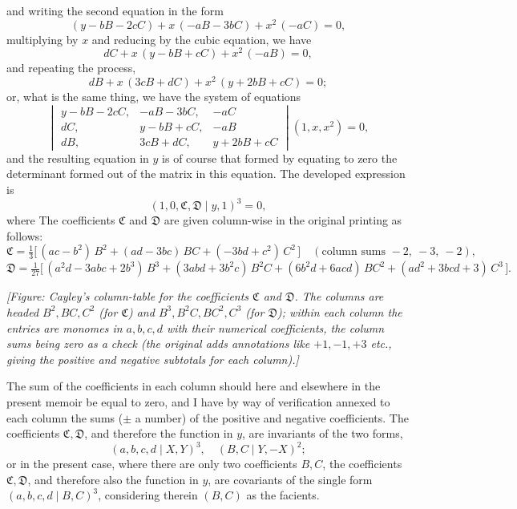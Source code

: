 \documentclass[11pt]{article}
\newcommand{\Cdel}{\mid}
\begin{document}
\noindent and writing the second equation in the form
\[
(y - b B - 2 c C) + x\,(-a B - 3 b C) + x^2\,(-a C) = 0,
\]
multiplying by $x$ and reducing by the cubic equation, we have
\[
dC + x\,(y - b B + c C) + x^2\,(-a B) = 0,
\]
and repeating the process,
\[
dB + x\,(3 c B + d C) + x^2\,(y + 2 b B + c C) = 0;
\]
or, what is the same thing, we have the system of equations
\[
\begin{vmatrix}
y - b B - 2 c C, & -a B - 3 b C, & -a C \\
d C, & y - b B + c C, & -a B \\
d B, & 3 c B + d C, & y + 2 b B + c C
\end{vmatrix}\!(1, x, x^2) = 0,
\]
and the resulting equation in $y$ is of course that formed by equating to zero the determinant formed out of the matrix in this equation. The developed expression is
\[
(1, 0, \mathfrak{C}, \mathfrak{D} \Cdel y, 1)^3 = 0,
\]
where
The coefficients $\mathfrak{C}$ and $\mathfrak{D}$ are given column-wise in the original printing as follows:
\[
\mathfrak{C} = \tfrac{1}{3}\big[\, (ac - b^2)\, B^2 + (ad - 3 bc)\, BC + (-3 bd + c^2)\, C^2\,\big] \quad (\text{column sums } -2,\ -3,\ -2),
\]
\[
\mathfrak{D} = \tfrac{1}{27}\big[\, (a^2 d - 3 abc + 2 b^3)\, B^3 + (3 abd + 3 b^2 c)\, B^2 C + (6 b^2 d + 6 acd)\, B C^2 + (a d^2 + 3 bcd + 3)\, C^3\,\big].
\]

\medskip

\textit{[Figure: Cayley's column-table for the coefficients $\mathfrak{C}$ and $\mathfrak{D}$. The columns are headed $B^2, BC, C^2$ (for $\mathfrak{C}$) and $B^3, B^2 C, B C^2, C^3$ (for $\mathfrak{D}$); within each column the entries are monomes in $a, b, c, d$ with their numerical coefficients, the column sums being zero as a check (the original adds annotations like $+1, -1, +3$ etc., giving the positive and negative subtotals for each column).]}

\medskip

The sum of the coefficients in each column should here and elsewhere in the present memoir be equal to zero, and I have by way of verification annexed to each column the sums ($\pm$ a number) of the positive and negative coefficients. The coefficients $\mathfrak{C}, \mathfrak{D}$, and therefore the function in $y$, are invariants of the two forms,
\[
(a, b, c, d \Cdel X, Y)^3,\quad (B, C \Cdel Y, -X)^2;
\]
or in the present case, where there are only two coefficients $B, C$, the coefficients $\mathfrak{C}, \mathfrak{D}$, and therefore also the function in $y$, are covariants of the single form $(a, b, c, d \Cdel B, C)^3$, considering therein $(B, C)$ as the facients.
\end{document}
